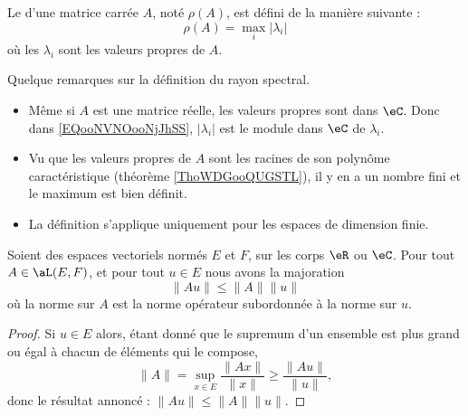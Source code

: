 \begin{definition}      \label{DEFooEAUKooSsjqaL}
    Le  d'une matrice carrée $A$, noté $\rho(A)$, est défini de la manière suivante :
    \begin{equation}    \label{EQooNVNOooNjJhSS}
        \rho(A)=\max_i|\lambda_i|
    \end{equation}
    où les $\lambda_i$ sont les valeurs propres de $A$.
\end{definition}

\begin{normaltext}
    Quelque remarques sur la définition du rayon spectral.
    \begin{itemize}
        \item 
             Même si \( A\) est une matrice réelle, les valeurs propres sont dans \( \eC\). Donc dans \eqref{EQooNVNOooNjJhSS}, \( | \lambda_i |\) est le module dans \( \eC\) de \( \lambda_i\).
        \item
            Vu que les valeurs propres de \( A\) sont les racines de son polynôme caractéristique (théorème \ref{ThoWDGooQUGSTL}), il y en a un nombre fini et le maximum est bien définit.
        \item
            La définition s'applique uniquement pour les espaces de dimension finie.
    \end{itemize}
\end{normaltext}

\begin{lemma}       \label{LEMooIBLEooLJczmu}
    Soient des espaces vectoriels normés \( E\) et \( F\), sur les corps \( \eR\) ou \( \eC\). Pour tout \( A\in \aL(E,F)\), et pour tout \( u\in E\) nous avons la majoration
    \begin{equation}
        \| Au \|\leq \| A \|\| u \|
    \end{equation}
    où la norme sur \( A\) est la norme opérateur subordonnée à la norme sur \( u\).
\end{lemma}

\begin{proof}
    Si \( u\in E\) alors, étant donné que le supremum d'un ensemble est plus grand ou égal à chacun de éléments qui le compose,
    \begin{equation}
        \| A \|=\sup_{x\in E}\frac{ \| Ax \| }{ \| x \| }\geq \frac{ \| Au \| }{ \| u \| },
    \end{equation}
    donc le résultat annoncé : \( \| Au \|\leq \| A \|\| u \|\).
\end{proof}

